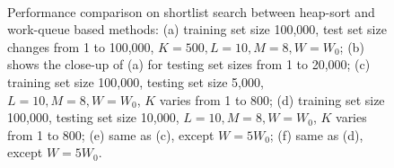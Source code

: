 \begin{figure}[!h]
    \\
\caption[Performance comparison between heap-sort and work-queue based methods used in Bi-level LSH shortlist search]{\label{fig:6:res:workqueuecomp} Performance comparison on shortlist search between heap-sort and work-queue based methods: (a) training set size 100,000, test set size changes from 1 to 100,000, $K=500, L=10, M=8, W=W_0$; (b) shows the close-up of (a) for testing set sizes from 1 to 20,000; (c) training set size 100,000, testing set size 5,000, $L=10, M=8, W=W_0$, $K$ varies from 1 to 800; (d) training set size 100,000, testing set size 10,000, $L=10, M=8, W=W_0$, $K$ varies from 1 to 800; (e) same as (c), except $W = 5W_0$; (f) same as (d), except $W = 5W_0$.}
\end{figure}
